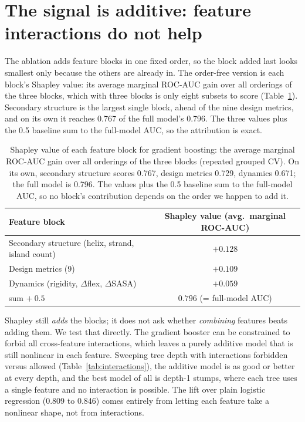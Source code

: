 \documentclass[11pt]{article}
\begin{document}
\section{The signal is additive: feature interactions do not help}

The ablation adds feature blocks in one fixed order, so the block added last looks smallest only because
the others are already in. The order-free version is each block's Shapley value: its average marginal
ROC-AUC gain over all orderings of the three blocks, which with three blocks is only eight subsets to
score (Table~\ref{tab:shapley}). Secondary structure is the largest single block, ahead of the nine design
metrics, and on its own it reaches 0.767 of the full model's 0.796. The three values plus the 0.5 baseline
sum to the full-model AUC, so the attribution is exact.

\begin{table}[h]
\centering
\caption{Shapley value of each feature block for gradient boosting: the average marginal ROC-AUC gain over
all orderings of the three blocks (repeated grouped CV). On its own, secondary structure scores 0.767,
design metrics 0.729, dynamics 0.671; the full model is 0.796. The values plus the 0.5 baseline sum to the
full-model AUC, so no block's contribution depends on the order we happen to add it.}
\label{tab:shapley}
\small
\begin{tabular}{@{}lc@{}}
\toprule
Feature block & Shapley value (avg.\ marginal ROC-AUC) \\
\midrule
Secondary structure (helix, strand, island count) & $+0.128$ \\
Design metrics (9) & $+0.109$ \\
Dynamics (rigidity, $\Delta$flex, $\Delta$SASA) & $+0.059$ \\
\midrule
sum $+\ 0.5$ & $0.796$ (= full-model AUC) \\
\bottomrule
\end{tabular}
\end{table}

Shapley still \emph{adds} the blocks; it does not ask whether \emph{combining} features beats adding them.
We test that directly. The gradient booster can be constrained to forbid all cross-feature interactions,
which leaves a purely additive model that is still nonlinear in each feature. Sweeping tree depth with
interactions forbidden versus allowed (Table~\ref{tab:interactions}), the additive model is as good or
better at every depth, and the best model of all is depth-1 stumps, where each tree uses a single feature
and no interaction is possible. The lift over plain logistic regression (0.809 to 0.846) comes entirely
from letting each feature take a nonlinear shape, not from interactions.
\end{document}
